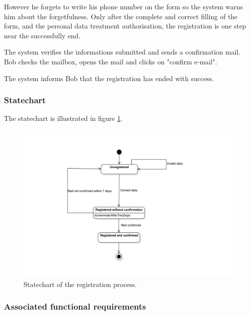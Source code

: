 However he forgets to write his phone number on the form so the system warns him about the forgetfulness.
Only after the complete and correct filling of the form, and the personal data treatment authorisation, the registration is one step near the successfully end.

The system verifies the informations submitted and sends a confirmation mail.
Bob checks the mailbox, opens the mail and clicks on "confirm e-mail". 

The system informs Bob that the registration has ended with success.

\subsubsection{Statechart}
The statechart is illustrated in figure \ref{fig:statechart-registration}.
\begin{figure}
\includegraphics[width=\textwidth]{diagrams/statechart_registration.pdf}
\caption{Statechart of the registration process.}
\label{fig:statechart-registration}
\end{figure}

\subsubsection{Associated functional requirements}

